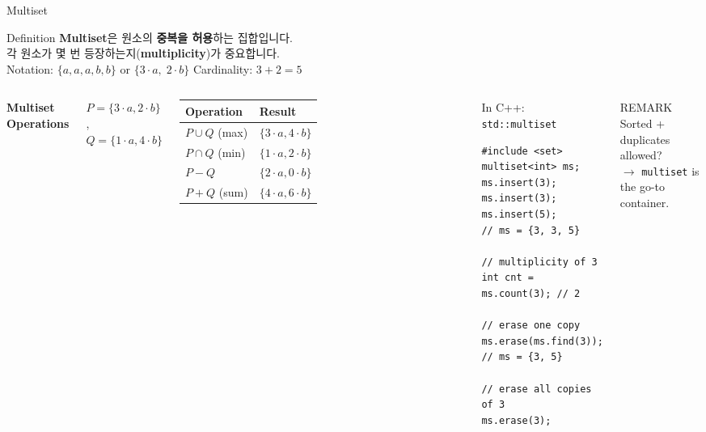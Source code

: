 \documentclass{beamer}
\begin{document}
\begin{frame}[t,shrink=3]{Multiset}
    \small
    \vspace{0.1cm}
    \begin{block}{Definition}
        \footnotesize
        \textbf{Multiset}은 원소의 \textbf{중복을 허용}하는 집합입니다.\\
        각 원소가 몇 번 등장하는지(\textbf{multiplicity})가 중요합니다.\\[4pt]
        Notation: $\{a, a, a, b, b\}$ or $\{3 \cdot a,\; 2 \cdot b\}$ \qquad Cardinality: $3 + 2 = 5$
    \end{block}

    \vspace{0.1cm}
    \begin{columns}[T]
        \textbf{Multiset Operations}
        \vspace{0.05cm}

        \footnotesize
        $P = \{3 \cdot a, 2 \cdot b\}$, \; $Q = \{1 \cdot a, 4 \cdot b\}$
        \vspace{0.1cm}

        \scriptsize
        \renewcommand{\arraystretch}{1.3}
        \begin{tabular}{ll}
            \toprule
            \textbf{Operation} & \textbf{Result} \\
            \midrule
            $P \cup Q$ (max) & $\{3 \cdot a, 4 \cdot b\}$ \\
            $P \cap Q$ (min) & $\{1 \cdot a, 2 \cdot b\}$ \\
            $P - Q$ & $\{2 \cdot a, 0 \cdot b\}$ \\
            $P + Q$ (sum) & $\{4 \cdot a, 6 \cdot b\}$ \\
            \bottomrule
        \end{tabular}
        \renewcommand{\arraystretch}{1}

        \begin{exampleblock}{In C++: \texttt{std::multiset}}
            \scriptsize
\begin{lstlisting}[style=cpp,basicstyle=\ttfamily\tiny\color{codefg}]
#include <set>
multiset<int> ms;
ms.insert(3); ms.insert(3); ms.insert(5);
// ms = {3, 3, 5}

// multiplicity of 3
int cnt = ms.count(3); // 2

// erase one copy
ms.erase(ms.find(3));
// ms = {3, 5}

// erase all copies of 3
ms.erase(3);
\end{lstlisting}
        \end{exampleblock}

        \vspace{0.05cm}
        \begin{alertblock}{\scriptsize REMARK}
            \scriptsize Sorted + duplicates allowed?\\
            $\to$ \texttt{multiset} is the go-to container.
        \end{alertblock}
    \end{columns}
\end{frame}
\end{document}

